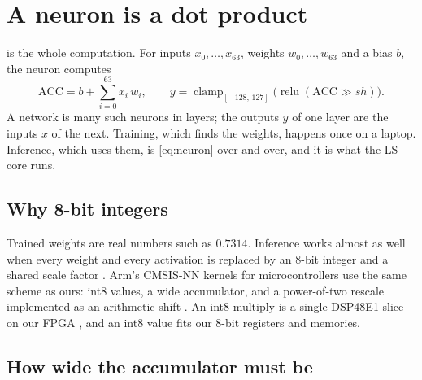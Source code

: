\section{A neuron is a dot product}\label{sec:background}


 is the whole computation. For inputs $x_0, \dots, x_{63}$, weights $w_0, \dots, w_{63}$ and a bias $b$, the neuron computes
\begin{equation}
\mathrm{ACC} = b + \sum_{i=0}^{63} x_i\, w_i, \qquad y = \operatorname{clamp}_{[-128,\,127]}\bigl(\operatorname{relu}(\mathrm{ACC} \gg sh)\bigr).
\label{eq:neuron}
\end{equation}
A network is many such neurons in layers; the outputs $y$ of one layer are the inputs $x$ of the next. Training, which finds the weights, happens once on a laptop. Inference, which uses them, is \cref{eq:neuron} over and over, and it is what the LS core runs.

\subsection{Why 8-bit integers}

Trained weights are real numbers such as $0.7314$. Inference works almost as well when every weight and every activation is replaced by an 8-bit integer and a shared scale factor \citep{jacob2018quantization}. Arm's CMSIS-NN kernels for microcontrollers use the same scheme as ours: int8 values, a wide accumulator, and a power-of-two rescale implemented as an arithmetic shift \citep{lai2018cmsisnn}. An int8 multiply is a single DSP48E1 slice on our FPGA \citep{xilinx2018ug479}, and an int8 value fits our 8-bit registers and memories.

\subsection{How wide the accumulator must be}


